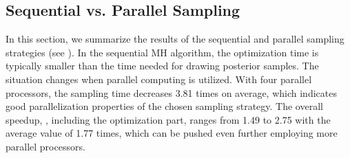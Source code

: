\subsection{Sequential vs. Parallel Sampling}
In this section, we summarize the results of the sequential and parallel  sampling strategies (see ).
In the sequential MH algorithm, the optimization time is typically smaller than the time needed for drawing posterior samples.
The situation changes when parallel computing is utilized. With four parallel processors, the sampling time decreases 3.81 times on average, which indicates good parallelization properties of the chosen sampling strategy.
The overall speedup, \ie, including the optimization part, ranges from 1.49 to 2.75 with the average value of 1.77 times, which can be pushed even further employing more parallel processors.
